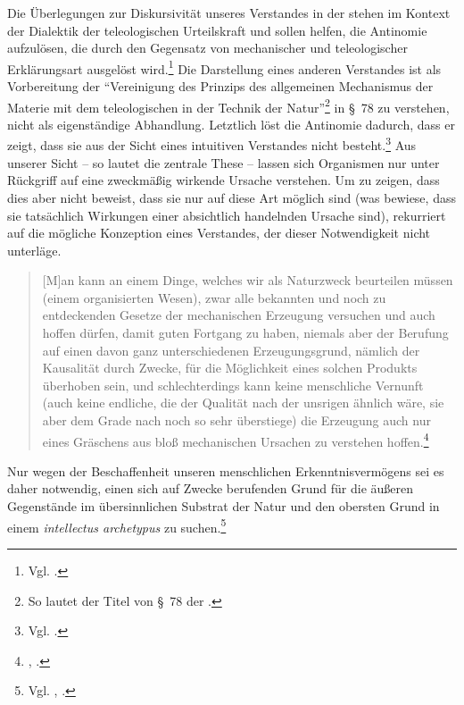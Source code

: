 Die Überlegungen zur Diskursivität unseres Verstandes in der  stehen im Kontext der Dialektik der teleologischen Urteilskraft
und sollen helfen, die Antinomie aufzulösen, die durch den Gegensatz von
mechanischer und teleologischer Erklärungsart ausgelöst wird.\footnote{Vgl.
\cite[][146]{McLaughlin:KantsKritikderteleologischenUrteilskraft1989}.} Die
Darstellung eines anderen Verstandes ist als Vorbereitung der
\enquote{Vereinigung des Prinzips des allgemeinen Mechanismus der Materie mit
dem teleologischen in der Technik der
Natur}\footnote{So lautet der Titel von
\S~78 der \cite{Kant:KritikderUrteilskraft2009}
\parencite[][V: 410.13--15]{Kant:GesammelteWerke1900ff.}.} in \S~78 zu
verstehen, nicht als eigenständige Abhandlung. Letztlich löst
 die Antinomie dadurch, dass er zeigt, dass sie aus der
Sicht eines intuitiven Verstandes nicht
besteht.\footnote{Vgl. \cite[][351]{Nuzzo:KantandtheUnityofReason2005}.} Aus
unserer Sicht -- so lautet die zentrale These -- lassen sich Organismen nur
unter Rückgriff auf eine zweckmäßig wirkende Ursache verstehen. Um zu zeigen,
dass dies aber nicht beweist, dass sie nur auf diese Art möglich sind (was
bewiese, dass sie tatsächlich Wirkungen einer absichtlich handelnden Ursache
sind), rekurriert  auf die mögliche Konzeption
eines  Verstandes, der dieser Notwendigkeit nicht unterläge.
\begin{quote}
[M]an kann an einem Dinge, welches wir als Naturzweck beurteilen müssen (einem
organisierten Wesen), zwar alle bekannten und noch zu entdeckenden Gesetze der
mechanischen Erzeugung versuchen und auch hoffen dürfen, damit guten Fortgang zu
haben, niemals aber der Berufung auf einen davon ganz unterschiedenen
Erzeugungsgrund, nämlich der Kausalität durch Zwecke, für die Möglichkeit eines
solchen Produkts überhoben sein, und schlechterdings kann keine menschliche
Vernunft (auch keine endliche, die der Qualität nach der unsrigen ähnlich wäre,
sie aber dem Grade nach noch so sehr überstiege) die Erzeugung auch nur eines
Gräschens aus bloß mechanischen Ursachen zu verstehen
hoffen.\footnote{\cite[][\S~77]{Kant:KritikderUrteilskraft2009},
\cite[][V: 409.27--37]{Kant:GesammelteWerke1900ff.}.}
\end{quote}
Nur wegen der Beschaffenheit unseren menschlichen Erkenntnisvermögens sei es
daher notwendig, einen sich auf Zwecke berufenden Grund für die äußeren
Gegenstände im übersinnlichen Substrat der Natur und den obersten Grund
in einem \emph{intellectus archetypus} zu
suchen.\footnote{Vgl. \cite[][\S~77]{Kant:KritikderUrteilskraft2009},
\cite[][V: 410-3--11]{Kant:GesammelteWerke1900ff.}.}

